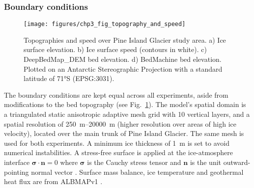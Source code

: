 





\subsubsection{Boundary conditions} \label{sec:boundary_conditions}

\begin{figure}[htbp]
  \texttt{[image: figures/chp3\_fig\_topography\_and\_speed]}
  \caption[Topographies and Speed over Pine Island Glacier]{
    Topographies and speed over Pine Island Glacier study area.
    a) Ice surface elevation.
    b) Ice surface speed (contours in white).
    c) DeepBedMap\_DEM bed elevation.
    d) BedMachine bed elevation.
    Plotted on an Antarctic Stereographic Projection with a standard latitude of 71°S (EPSG:3031).
  }
  \label{fig:topo_and_speed}
\end{figure}

The boundary conditions are kept equal across all experiments, aside from modifications to the bed topography (see Fig.~\ref{fig:topo_and_speed}). %
The model's spatial domain is a triangulated static anisotropic adaptive mesh grid with 10 vertical layers, and a spatial resolution of \SIrange{250}{20000}{\metre} (higher resolution over areas of high ice velocity), located over the main trunk of Pine Island Glacier.
The same mesh is used for both experiments.
A minimum ice thickness of \SI{1}{\metre} is set to avoid numerical instabilities.
A stress-free surface is applied at the ice-atmosphere interface $\boldsymbol{\sigma} \cdot \boldsymbol{n} = 0$ where $\boldsymbol{\sigma}$ is the Cauchy stress tensor and $\boldsymbol{n}$ is the unit outward-pointing normal vector \citep[][eq. 18]{LarourContinentalscalehigh2012}.
Surface mass balance, ice temperature and geothermal heat flux are from ALBMAPv1 \citep{LeBrocqimprovedAntarcticdataset2010}.

